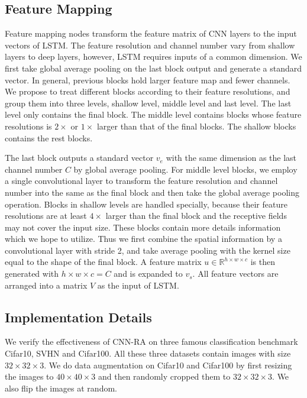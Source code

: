 \documentclass[runningheads]{llncs}
\begin{document}
\subsection{Feature Mapping}

Feature mapping nodes transform the feature matrix of CNN layers to the input vectors of LSTM. The feature resolution and channel number vary from shallow layers to deep layers, however, LSTM requires inputs of a common dimension. We first take global average pooling on the last block output and generate a standard vector. In general, previous blocks hold larger feature map and fewer channels. We propose to treat different blocks according to their feature resolutions, and group them into three levels, shallow level, middle level and last level. The last level only contains the final block. The middle level contains blocks whose feature resolutions is $2\times$ or $1\times$ larger than that of the final blocks. The shallow blocks contains the rest blocks. 

The last block outputs a standard vector $v_e$ with the same dimension as the last channel number $C$ by global average pooling. For middle level blocks, we employ a single convolutional layer to transform the feature resolution and channel number into the same as the final block and then take the global average pooling operation. Blocks in shallow levels are handled specially, because their feature resolutions are at least $4\times$ larger than the final block and the receptive fields may not cover the input size. These blocks contain more details information which we hope to utilize. Thus we first combine the spatial information by a convolutional layer with stride 2, and take average pooling with the kernel size equal to the shape of the final block. A feature matrix $u \in \mathbb{R}^{h\times w \times c}$ is then generated with $h\times w \times c = C$ and is expanded to $v_s$. All feature vectors are arranged into a matrix $V$ as the input of LSTM.

\subsection{Implementation Details}

We verify the effectiveness of CNN-RA on three famous classification benchmark Cifar10\cite{cifar}, SVHN\cite{SVHN} and Cifar100\cite{cifar}. All these three datasets contain images with size $32\times 32\times 3$. We do data augmentation on Cifar10 and Cifar100 by first resizing the images to $40\times 40\times 3$ and then randomly cropped them to $32\times 32\times 3$. We also flip the images at random.
\end{document}
